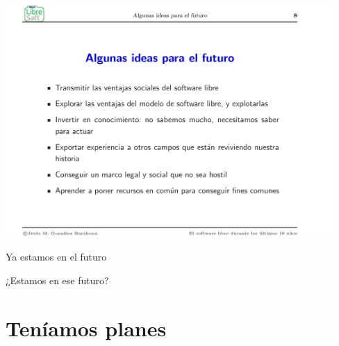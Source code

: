\documentclass[17pt,aspectratio=169]{beamer}
\begin{document}
\begin{frame}

\begin{center}
  \includegraphics[width=12.5cm]{figs/transpas-09}
\end{center}  

\end{frame}

\begin{frame}

  \begin{center}
    {\large
      Ya estamos en el futuro \\
      \vspace{1cm}

      ¿Estamos en ese futuro? \\
    }
  \end{center}
  
\end{frame}

\section{Teníamos planes}
\end{document}
